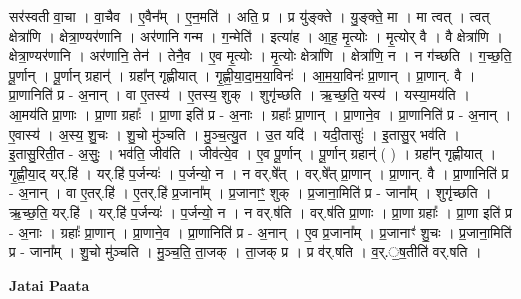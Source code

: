 \documentclass[17pt]{extarticle}
\begin{document}
सर॑स्वती वा॒चा । वा॒चैव । ए॒वैन᳚म् । ए॒न॒मति॑ । अति॒ प्र । प्र यु॑ङ्‍क्ते । यु॒ङ्‍क्ते॒ मा । मा त्वत् । त्वत् क्षेत्रा॑णि । क्षेत्रा॒ण्यर॑णानि । अर॑णानि गन्म । ग॒न्मेति॑ । इत्या॑ह । आ॒ह॒ मृ॒त्योः । मृ॒त्योर् वै । वै क्षेत्रा॑णि । क्षेत्रा॒ण्यर॑णानि । अर॑णानि॒ तेन॑ । तेनै॒व । ए॒व मृ॒त्योः । मृ॒त्योः क्षेत्रा॑णि । क्षेत्रा॑णि॒ न । न ग॑च्छति । ग॒च्छ॒ति॒ पू॒र्णान् । पू॒र्णान् ग्रहान्॑ । ग्रहा᳚न् गृह्णीयात् । गृ॒ह्णी॒या॒दा॒म॒या॒विनः॑ । आ॒म॒या॒विनः॑ प्रा॒णान् । प्रा॒णान्. वै । प्रा॒णानिति॑ प्र - अ॒नान् । वा ए॒तस्य॑ । ए॒तस्य॒ शुक् । शुगृ॑च्छति । ऋ॒च्छ॒ति॒ यस्य॑ । यस्या॒मय॑ति । आ॒मय॑ति प्रा॒णाः । प्रा॒णा ग्रहाः᳚ । प्रा॒णा इति॑ प्र - अ॒नाः । ग्रहाः᳚ प्रा॒णान् । प्रा॒णाने॒व । प्रा॒णानिति॑ प्र - अ॒नान् । ए॒वास्य॑ । अ॒स्य॒ शु॒चः । शु॒चो मु॑ञ्चति । मु॒ञ्च॒त्यु॒त । उ॒त यदि॑ । यदी॒तासुः॑ । इ॒तासु॒र् भव॑ति । इ॒तासु॒रिती॒त - अ॒सुः॒ । भव॑ति॒ जीव॑ति । जीव॑त्ये॒व । ए॒व पू॒र्णान् । पू॒र्णान् ग्रहान्॑ ( ) । ग्रहा᳚न् गृह्णीयात् । गृ॒ह्णी॒या॒द् यर्.हि॑ । यर्.हि॑ प॒र्जन्यः॑ । प॒र्जन्यो॒ न । न वर्.षे᳚त् । वर्.षे᳚त् प्रा॒णान् । प्रा॒णान्. वै । प्रा॒णानिति॑ प्र - अ॒नान् । वा ए॒तर्.हि॑ । ए॒तर्.हि॑ प्र॒जाना᳚म् । प्र॒जानाꣳ॒॒ शुक् । प्र॒जाना॒मिति॑ प्र - जाना᳚म् । शुगृ॑च्छति । ऋ॒च्छ॒ति॒ यर्.हि॑ । यर्.हि॑ प॒र्जन्यः॑ । प॒र्जन्यो॒ न । न वर्.ष॑ति । वर्.ष॑ति प्रा॒णाः । प्रा॒णा ग्रहाः᳚ । प्रा॒णा इति॑ प्र - अ॒नाः । ग्रहाः᳚ प्रा॒णान् । प्रा॒णाने॒व । प्रा॒णानिति॑ प्र - अ॒नान् । ए॒व प्र॒जाना᳚म् । प्र॒जानाꣳ॑ शु॒चः । प्र॒जाना॒मिति॑ प्र - जाना᳚म् । शु॒चो मु॑ञ्चति । मु॒ञ्च॒ति॒ ता॒जक् । ता॒जक् प्र । प्र व॑र्.षति । व॒र्.॒ष॒तीति॑ वर्.षति । \newline

\textbf{Jatai Paata} \newline
\end{document}
